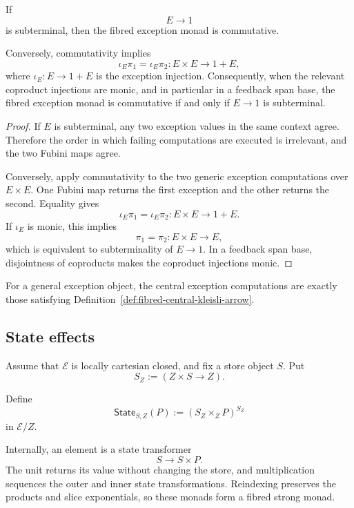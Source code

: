 \begin{proposition}
\label{prop:exception-commutativity}
If
\[
    E\longrightarrow1
\]
is subterminal, then the fibred exception monad is commutative.

Conversely, commutativity implies
\[
    \iota_E\pi_1
    =
    \iota_E\pi_2:
    E\times E\longrightarrow1+E,
\]
where \(\iota_E:E\to1+E\) is the exception injection.  Consequently, when
the relevant coproduct injections are monic, and in particular in a feedback
span base, the fibred exception monad is commutative if and only if
\(E\to1\) is subterminal.
\end{proposition}

\begin{proof}
If \(E\) is subterminal, any two exception values in the same context agree.
Therefore the order in which failing computations are executed is
irrelevant, and the two Fubini maps agree.

Conversely, apply commutativity to the two generic exception computations
over \(E\times E\).  One Fubini map returns the first exception and the other
returns the second.  Equality gives
\[
    \iota_E\pi_1
    =
    \iota_E\pi_2:
    E\times E\to1+E.
\]
If \(\iota_E\) is monic, this implies
\[
    \pi_1=\pi_2:
    E\times E\to E,
\]
which is equivalent to subterminality of \(E\to1\).  In a feedback span base,
disjointness of coproducts makes the coproduct injections monic.
\end{proof}

For a general exception object, the central exception computations are
exactly those satisfying
Definition~\ref{def:fibred-central-kleisli-arrow}.

\subsection{State effects}
\label{subsec:state-effects}

Assume that \(\mathcal E\) is locally cartesian closed, and fix a store object
\(S\).  Put
\[
    S_Z:=(Z\times S\to Z).
\]

\begin{definition}
\label{def:fibred-state-monad}
Define
\[
    \mathsf{State}_{S,Z}(P)
    :=
    (S_Z\times_ZP)^{S_Z}
\]
in \(\mathcal E/Z\).
\end{definition}

Internally, an element is a state transformer
\[
    S\longrightarrow S\times P.
\]
The unit returns its value without changing the store, and multiplication
sequences the outer and inner state transformations.  Reindexing preserves
the products and slice exponentials, so these monads form a fibred strong
monad.

